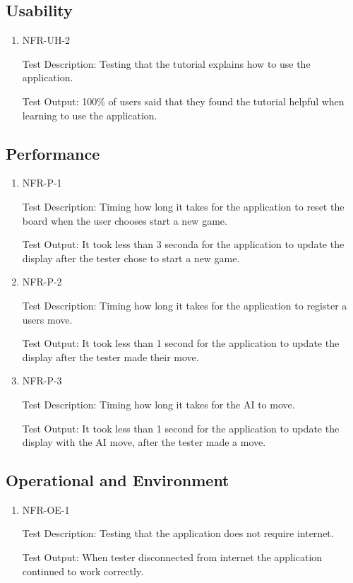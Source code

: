 \documentclass[12pt, titlepage]{article}
\begin{document}
\subsection{Usability}
\begin{enumerate}
    \item {NFR-UH-2}

    Test Description: Testing that the tutorial explains how to use the application.
    
    Test Output: 100\% of users said that they found the tutorial helpful when learning to use the application.
\end{enumerate}

\subsection{Performance}
\begin{enumerate}
    \item {NFR-P-1}

    Test Description: Timing how long it takes for the application to reset the board when the user chooses start a new game.
    
    Test Output: It took less than 3 seconda for the application to update the display after the tester chose to start a new game.
    \item {NFR-P-2}

    Test Description: Timing how long it takes for the application to register a users move.
    
    Test Output: It took less than 1 second for the application to update the display after the tester made their move.
    \item {NFR-P-3}

    Test Description: Timing how long it takes for the AI to move.
    
    Test Output: It took less than 1 second for the application to update the display with the AI move, after the tester made a move.
\end{enumerate}

\subsection{Operational and Environment}
\begin{enumerate}
    \item {NFR-OE-1}

    Test Description: Testing that the application does not require internet.
    
    Test Output: When tester disconnected from internet the application continued to work correctly.
\end{enumerate}
\end{document}
